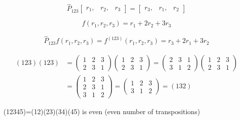\documentclass[11pt,a4paper]{book}
\begin{document}
		\begin{equation}
			\hat{P}_{123}
			\begin{bmatrix}
				r_1, & r_2,  & r_3
			\end{bmatrix}
			=
			\begin{bmatrix}
				r_3, & r_1,  & r_2
			\end{bmatrix}			
		\end{equation}
		
		\begin{equation}
		f(r_1,r_2,r_3)=r_1 + 2r_2 + 3r_3
		\end{equation}
		
		\begin{equation}
			\begin{split}
				\hat{P}_{123}f(r_1, r_2, r_3) = f^{(123)}(r_1, r_2, r_3) =r_3 + 2 r_1  + 3 r_2
			\end{split}
		\end{equation}
		
		\begin{equation}
			\begin{split}
				(123)(123)&=
				\begin{pmatrix}
					1 & 2 & 3 \\
					2 & 3 & 1
				\end{pmatrix} 
				\begin{pmatrix}
					1 & 2 & 3 \\
					2 & 3 & 1
				\end{pmatrix} 
				=
				\begin{pmatrix}
					2 & 3 & 1 \\
					3 & 1 & 2
				\end{pmatrix} 
				\begin{pmatrix}
					1 & 2 & 3 \\
					2 & 3 & 1
				\end{pmatrix} \\
				&=
				\begin{pmatrix}
					1 & 2 & 3 \\
					2 & 3 & 1 \\
					3 & 1 & 2 
				\end{pmatrix} 	
				=	
				\begin{pmatrix}
					1 & 2 & 3 \\
					3 & 1 & 2 
				\end{pmatrix}
				=
				(132)
			\end{split}
		\end{equation}
		
		(12345)=(12)(23)(34)(45) is even (even number of transpositions)
		
\end{document}
